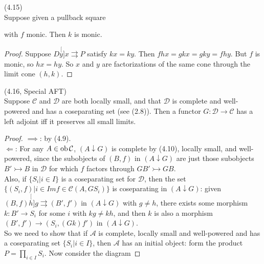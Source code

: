\documentclass[a4paper]{article}
\begin{document}
\begin{lemma} (4.15)\\
    Suppose given a pullback square
    with $f$ monic. Then $k$ is monic.
    \begin{proof}
        Suppose $D \stackrel[y]{x}{\rightrightarrows} P$ satisfy $kx=ky$. Then $fhx=gkx=gky=fhy$. But $f$ is monic, so $hx=hy$. So $x$ and $y$ are factorizations of the same cone through the limit cone $(h,k)$.
    \end{proof}
\end{lemma}

\begin{thm} (4.16, Special AFT)\\
    Suppose $\mathcal{C}$ and $\mathcal{D}$ are both locally small, and that $\mathcal{D}$ is complete and well-powered and has a coseparating set (see (2.8)). Then a functor $G:\mathcal{D} \to \mathcal{C}$ has a left adjoint iff it preserves all small limits.
    \begin{proof}
        $\implies$: by (4.9).\\
        $\Leftarrow$: For any $A \in \operatorname{ob}\mathcal{C}$, $(A \downarrow G)$ is complete by (4.10), locally small, and well-powered, since the subobjects of $(B,f)$ in $(A\downarrow G)$ are just those subobjects $B' \rightarrowtail B$ in $\mathcal{D}$ for which $f$ factors through $GB' \rightarrowtail GB$.\\
        Also, if $\{S_i | i \in I\}$ is a coseparating set for $\mathcal{D}$, then the set $\{(S_i, f)|i \in Im f \in \mathcal{C}(A,GS_i)\}$ is coseparating in $(A \downarrow G)$: given $(B,f) \stackrel[h]{g}{\rightrightarrows} (B',f')$ in $(A \downarrow G)$ with $g \neq h$, there exists some morphism $k:B' \to S_i$ for some $i$ with $kg \neq kh$, and then $k$ is also a morphism $(B',f') \to (S_i,(Gk)f')$ in $(A \downarrow G)$.\\
        So we need to show that if $\mathcal{A}$ is complete, locally small and well-powered and has a coseparating set $\{S_i|i \in I\}$, then $\mathcal{A}$ has an initial object: form the product $P=\prod_{i \in I} S_i$. Now consider the diagram



\end{proof}
\end{thm}
\end{document}
